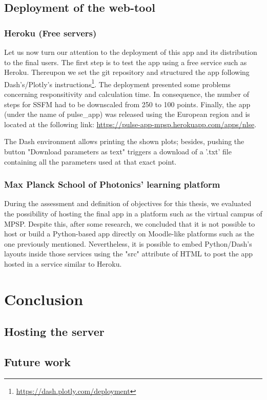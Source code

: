 



    \section{Deployment of the web-tool}
        \subsection{Heroku (Free servers)}
            Let us now turn our attention to the deployment of this app and its distribution to the final users. The first step is to test the app using a free service such as Heroku. Thereupon we set the git repository and structured the app following Dash's/Plotly's instructions\footnote{\url{https://dash.plotly.com/deployment}}. The deployment presented some problems concerning responsitivity and calculation time. In consequence, the number of steps for SSFM had to be downscaled from 250 to 100 points. Finally, the app (under the name of pulse\_app) was released using the European region and is located at the following link: \url{https://pulse-app-mpsp.herokuapp.com/apps/nlse}.
            
            The Dash environment allows printing the shown plots; besides, pushing the button "Download parameters as text" triggers a download of a '.txt' file containing all the parameters used at that exact point.
    
       
        
        
        
        \subsection{Max Planck School of Photonics' learning platform}
        During the assessment and definition of objectives for this thesis, we evaluated the possibility of hosting the final app in a platform such as the virtual campus of \gls{MPSP}. Despite this, after some research, we concluded that it is not possible to host or build a Python-based app directly on Moodle-like platforms such as the one previously mentioned. Nevertheless, it is possible to embed Python/Dash's layouts inside those services using the "src" attribute of HTML to post the app hosted in a service similar to Heroku.
         



\chapter{Conclusion}
    
    \section{Hosting the server}
    \section{Future work}
    